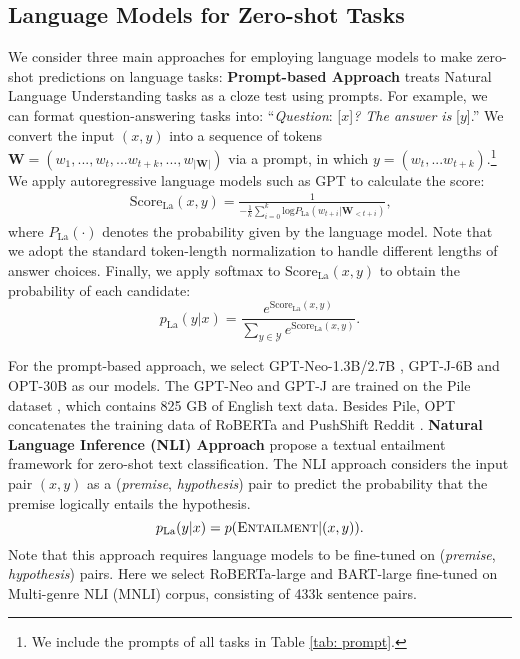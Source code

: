\documentclass[11pt]{article}
\begin{document}
\subsection{Language Models for Zero-shot Tasks} \label{sec lm}
We consider three main approaches for employing language models to make zero-shot predictions on language tasks:
\medbreak
\noindent \textbf{Prompt-based Approach} \cite{petroni-etal-2019-language, schick-schutze-2021-exploiting} treats Natural Language Understanding tasks as a cloze test using prompts. For example, we can format question-answering tasks into: 
\medbreak
``\textit{Question}: [$x$]\textit{? The answer is} [$y$].''
\medbreak
We convert the input $(x, y)$ into a sequence of tokens $\textbf{W} = (w_1, ..., w_t, ... w_{t + k}, ..., w_{|\textbf{W}|})$ via a prompt, in which $y = (w_t, ... w_{t + k})$.\footnote{We include the prompts of all tasks in Table \ref{tab: prompt}.} We apply autoregressive language models such as GPT \cite{brown2020language} to calculate the score:
\begin{align}
    \text{Score}_{\text{La}}(x, y) = \frac{1}{-\frac{1}{k}\sum_{i=0}^{k} \textrm{log}P_{\text{La}} (w_{t+i} | \textbf{W}_{< t + i})}\text{,}
    \nonumber
\end{align}
where $P_{\text{La}}(\cdot)$ denotes the probability given by the language model. Note that we adopt the standard token-length normalization to handle different lengths of answer choices. Finally, we apply softmax to $\text{Score}_{\text{La}}(x, y)$ to obtain the probability of each candidate:
\begin{equation} \label{eq: softmax}
    p_{\text{La}}(y | x) = \frac{e^{\text{Score}_{\text{La}}(x, y)}}{\sum_{y \in \mathcal{Y}} e^{\text{Score}_{\text{La}}(x, y)}}.
\end{equation}

For the prompt-based approach, we select GPT-Neo-1.3B/2.7B \cite{gpt-neo}, GPT-J-6B \cite{gpt-j} and OPT-30B \cite{zhang2022opt} as our models. The GPT-Neo and GPT-J are trained on the Pile dataset \cite{gao2020pile}, which contains 825 GB of English text data. Besides Pile, OPT concatenates the training data of RoBERTa \cite{liu2019roberta} and PushShift Reddit \cite{baumgartner2020pushshift}.
\medbreak
\noindent\textbf{Natural Language Inference (NLI) Approach} 
\cite{yin-etal-2019-benchmarking} propose a textual entailment framework for zero-shot text classification.
The NLI approach considers the input pair $(x, y)$ as a (\textit{premise}, \textit{hypothesis}) pair
to predict the probability that the premise logically entails the hypothesis. 
\begin{equation}
    p_{\text{La}}(y | x) = p(\textsc{Entailment}|(x, y)).
\end{equation}
Note that this approach requires language models to be fine-tuned on (\textit{premise}, \textit{hypothesis}) pairs. 
Here we select RoBERTa-large \cite{liu2019roberta} and BART-large \cite{lewis-etal-2020-bart} fine-tuned on Multi-genre NLI (MNLI) corpus, \cite{williams-etal-2018-broad} consisting of 433k sentence pairs.
\end{document}
